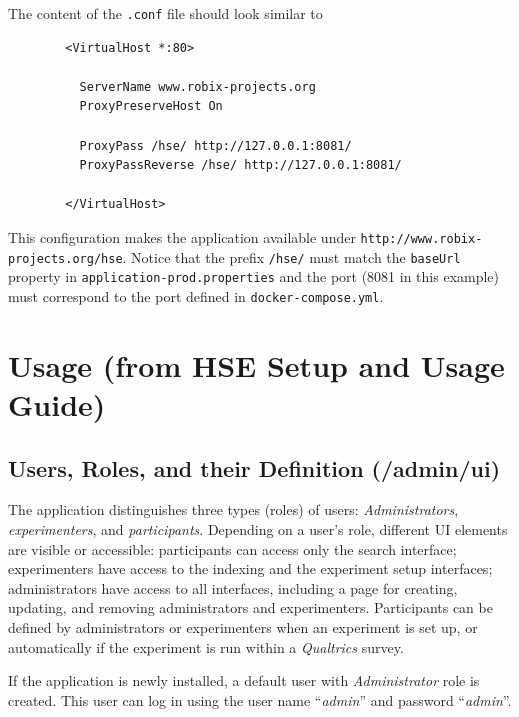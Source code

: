 \documentclass[a4paper]{usiinfbachelorproject}
\begin{document}
\begin{appendices}
        The content of the \texttt{.conf} file should look similar to

        \begin{verbatim}
        <VirtualHost *:80>

          ServerName www.robix-projects.org
          ProxyPreserveHost On

          ProxyPass /hse/ http://127.0.0.1:8081/
          ProxyPassReverse /hse/ http://127.0.0.1:8081/

        </VirtualHost>
        \end{verbatim}

        This configuration makes the application available under \texttt{http://www.robix-projects.org/hse}. Notice that
        the prefix \texttt{/hse/} must match the \texttt{baseUrl} property in \texttt{application-prod.properties}
        and the port (8081 in this example) must correspond to the port defined in \texttt{docker-compose.yml}. 

        \section{Usage (from HSE Setup and Usage Guide)}
        \label{sec:usage}


        \subsection{Users, Roles, and their Definition \small{(/admin/ui)}}

        The application distinguishes three types (roles) of users: \emph{Administrators}, \emph{experimenters}, and \emph{participants}.
        Depending on a user's role, different UI elements are visible or accessible: participants can access only the search interface; 
        experimenters have access to the indexing and the experiment setup interfaces; administrators have access to all interfaces,
        including a page for creating, updating, and removing administrators and experimenters. Participants can be defined
        by administrators or experimenters when an experiment is set up, or automatically if the experiment is run within
        a \emph{Qualtrics} survey.

        If the application is newly installed, a default user with \emph{Administrator} role is created. This user can log in using
        the user name ``\emph{admin}'' and password ``\emph{admin}''.


\end{appendices}
\end{document}
